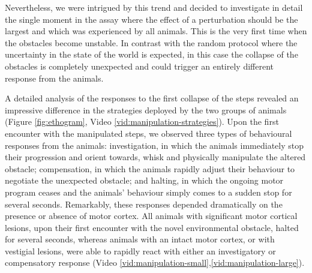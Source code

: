 Nevertheless, we were intrigued by this trend and decided to investigate in detail the single moment in the assay where the effect of a perturbation should be the largest and which was experienced by all animals. This is the very first time when the obstacles become unstable. In contrast with the random protocol where the uncertainty in the state of the world is expected, in this case the collapse of the obstacles is completely unexpected and could trigger an entirely different response from the animals.

A detailed analysis of the responses to the first collapse of the steps revealed an impressive difference in the strategies deployed by the two groups of animals (Figure \ref{fig:ethogram}, Video \ref{vid:manipulation-strategies}). Upon the first encounter with the manipulated steps, we observed three types of behavioural responses from the animals: investigation, in which the animals immediately stop their progression and orient towards, whisk and physically manipulate the altered obstacle; compensation, in which the animals rapidly adjust their behaviour to negotiate the unexpected obstacle; and halting, in which the ongoing motor program ceases and the animals' behaviour simply comes to a sudden stop for several seconds. Remarkably, these responses depended dramatically on the presence or absence of motor cortex. All animals with significant motor cortical lesions, upon their first encounter with the novel environmental obstacle, halted for several seconds, whereas animals with an intact motor cortex, or with vestigial lesions, were able to rapidly react with either an investigatory or compensatory response (Video \ref{vid:manipulation-small},\ref{vid:manipulation-large}).
